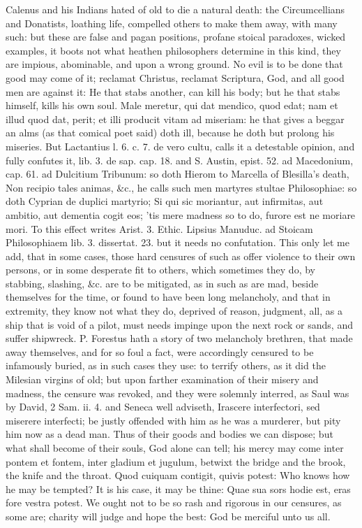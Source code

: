 Calenus and his Indians hated of old to die a natural death: the
Circumcellians and Donatists, loathing life, compelled others to make
them away, with many such: but these are false and pagan
positions, profane stoical paradoxes, wicked examples, it boots not
what heathen philosophers determine in this kind, they are impious,
abominable, and upon a wrong ground. No evil is to be done that good
may come of it; reclamat Christus, reclamat Scriptura, God, and all
good men are against it: He that stabs another, can kill his
body; but he that stabs himself, kills his own soul. Male
meretur, qui dat mendico, quod edat; nam et illud quod dat, perit; et
illi producit vitam ad miseriam: he that gives a beggar an alms (as
that comical poet said) doth ill, because he doth but prolong his
miseries. But Lactantius l. 6. c. 7. de vero cultu, calls it a
detestable opinion, and fully confutes it, lib. 3. de sap. cap. 18. and
S. Austin, epist. 52. ad Macedonium, cap. 61. ad Dulcitium Tribunum: so
doth Hierom to Marcella of Blesilla's death, Non recipio tales animas,
\&c., he calls such men martyres stultae Philosophiae: so doth Cyprian
de duplici martyrio; Si qui sic moriantur, aut infirmitas, aut ambitio,
aut dementia cogit eos; 'tis mere madness so to do, furore est ne
moriare mori. To this effect writes Arist. 3. Ethic. Lipsius Manuduc.
ad Stoicam Philosophiaem lib. 3. dissertat. 23. but it needs no
confutation. This only let me add, that in some cases, those hard
censures of such as offer violence to their own persons, or in some
desperate fit to others, which sometimes they do, by stabbing,
slashing, \&c. are to be mitigated, as in such as are mad, beside
themselves for the time, or found to have been long melancholy, and
that in extremity, they know not what they do, deprived of reason,
judgment, all, as a ship that is void of a pilot, must needs
impinge upon the next rock or sands, and suffer shipwreck. P.
Forestus hath a story of two melancholy brethren, that made away
themselves, and for so foul a fact, were accordingly censured to be
infamously buried, as in such cases they use: to terrify others, as it
did the Milesian virgins of old; but upon farther examination of their
misery and madness, the censure was revoked, and they were
solemnly interred, as Saul was by David, 2 Sam. ii. 4. and Seneca well
adviseth, Irascere interfectori, sed miserere interfecti; be justly
offended with him as he was a murderer, but pity him now as a dead man.
Thus of their goods and bodies we can dispose; but what shall become of
their souls, God alone can tell; his mercy may come inter pontem et
fontem, inter gladium et jugulum, betwixt the bridge and the brook, the
knife and the throat. Quod cuiquam contigit, quivis potest: Who knows
how he may be tempted? It is his case, it may be thine: Quae sua
sors hodie est, eras fore vestra potest. We ought not to be so rash and
rigorous in our censures, as some are; charity will judge and hope the
best: God be merciful unto us all.
